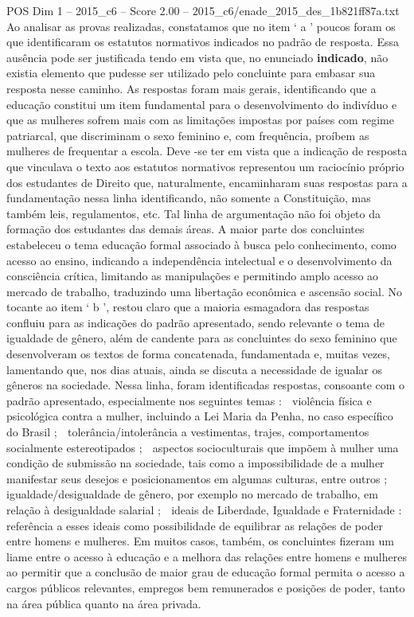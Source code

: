 \begin{textsample}{POS Dim 1 – 2015\_c6 – Score 2.00 – 2015\_c6/enade\_2015\_des\_1b821ff87a.txt}
Ao analisar as provas realizadas, constatamos que no item ‘ a ’ poucos foram os que identificaram os estatutos normativos indicados no padrão de resposta.
Essa ausência pode ser justificada tendo em vista que, no enunciado \textbf{indicado}, não existia elemento que pudesse ser utilizado pelo concluinte para embasar sua resposta nesse caminho.
As respostas foram mais gerais, identificando que a educação constitui um item fundamental para o desenvolvimento do indivíduo e que as mulheres sofrem mais com as limitações impostas por países com regime patriarcal, que discriminam o sexo feminino e, com frequência, proíbem as mulheres de frequentar a escola.
Deve -se ter em vista que a indicação de resposta que vinculava o texto aos estatutos normativos representou um raciocínio próprio dos estudantes de Direito que, naturalmente, encaminharam suas respostas para a fundamentação nessa linha identificando, não somente a Constituição, mas também leis, regulamentos, etc.
Tal linha de argumentação não foi objeto da formação dos estudantes das demais áreas.
A maior parte dos concluintes estabeleceu o tema educação formal associado à busca pelo conhecimento, como acesso ao ensino, indicando a independência intelectual e o desenvolvimento da consciência crítica, limitando as manipulações e permitindo amplo acesso ao mercado de trabalho, traduzindo uma libertação econômica e ascensão social.
No tocante ao item ‘ b ’, restou claro que a maioria esmagadora das respostas confluiu para as indicações do padrão apresentado, sendo relevante o tema de igualdade de gênero, além de candente para as concluintes do sexo feminino que desenvolveram os textos de forma concatenada, fundamentada e, muitas vezes, lamentando que, nos dias atuais, ainda se discuta a necessidade de igualar os gêneros na sociedade.
Nessa linha, foram identificadas respostas, consoante com o padrão apresentado, especialmente nos seguintes temas :  violência física e psicológica contra a mulher, incluindo a Lei Maria da Penha, no caso específico do Brasil ;  tolerância/intolerância a vestimentas, trajes, comportamentos socialmente estereotipados ;  aspectos socioculturais que impõem à mulher uma condição de submissão na sociedade, tais como a impossibilidade de a mulher manifestar seus desejos e posicionamentos em algumas culturas, entre outros ;  igualdade/desigualdade de gênero, por exemplo no mercado de trabalho, em relação à desigualdade salarial ;  ideais de Liberdade, Igualdade e Fraternidade : referência a esses ideais como possibilidade de equilibrar as relações de poder entre homens e mulheres.
Em muitos casos, também, os concluintes fizeram um liame entre o acesso à educação e a melhora das relações entre homens e mulheres ao permitir que a conclusão de maior grau de educação formal permita o acesso a cargos públicos relevantes, empregos bem remunerados e posições de poder, tanto na área pública quanto na área privada.

\end{textsample}
